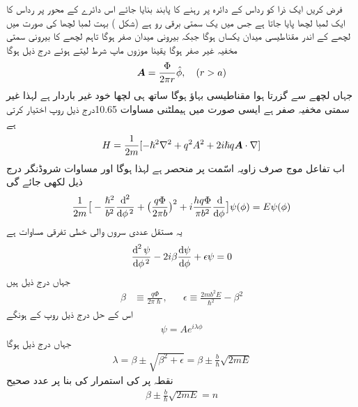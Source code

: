  فرض کریں ایک ذرا کو رداس  کے دائرہ پر رہنے کا پابند بنایا جائے اس دائرے کے محور پر رداس  کا ایک لمبا لچھا پایا جاتا ہے جس میں یک سمتی برقی رو  ہے  (شکل  )   بہت لمبا لچھا کی صورت میں لچھے کے اندر مقناطیسی میدان یکساں ہوگا جبکہ بیرونی میدان صفر ہوگا تاہم لچھے کا بیرونی سمتی مخفیہ غیر صفر ہوگا یقینا موزوں ماپ شرط  لیتے ہوئے درج ذیل ہوگا 
\begin{align}
{\ensuremath{{\boldsymbol{A}}}} = \frac{\Phi}{2\pi r} \hat{\phi}, \quad (r > a)
\end{align}
جہاں  لچھے سے گزرتا ہوا  مقناطیسی بہاؤ ہوگا ساتھ ہی لچھا خود غیر باردار ہے لہذا غیر سمتی مخفیہ  صفر ہے ایسی صورت میں ہیملٹنی مساوات 10.65درج ذیل روپ اختیار کرتی ہے 
\begin{align}
H = \frac{1}{2m} [- \hslash^2 \nabla^2 + q^2 A^2 + 2 i \hslash q {{\boldsymbol{A}}} \cdot \nabla]
\end{align}
اب تفاعل موج صرف زاویہ اسّمت  پر منحصر ہے لہذا  ہوگا اور مساوات شروڈنگر درج ذیل لکھی جائے گی 
\begin{align}
\frac{1}{2m} \big [ - \frac{\hslash^2}{b^2} \frac{\dif^{\,2}}{\dif \phi^{\,2}} + \big ( \frac{q \Phi}{2 \pi b} \big )^2 + i \frac{h q \Phi}{\pi b^2} \frac{\dif}{\dif \phi} \big ] \psi (\phi) = E \psi (\phi)
\end{align}
یہ مستقل عددی سروں والی خطی تفرقی مساوات ہے
\begin{align}
\frac{\dif^{\,2} \psi}{\dif \phi^{\,2}} - 2i \beta \frac{\dif \psi}{\dif \phi} + \epsilon \psi = 0
\end{align}
جہاں درج ذیل ہیں
\begin{align}
\beta &\equiv \frac{q \Phi}{2 \pi \hslash}, && \epsilon \equiv \frac{2 m b ^2 E}{\hslash^2} - \beta^2
\end{align}
اس کے حل درج ذیل روپ کے ہونگے 
\begin{align}
\psi = Ae^{i \lambda \phi}
\end{align}
جہاں درج ذیل ہوگا 
\begin{align}
\lambda = \beta \pm \sqrt{ \beta^2 + \epsilon} = \beta \pm \frac{b}{\hslash} \sqrt{2 m E}
\end{align}
نقطہ  پر  کی استمرار کی بنا پر  عدد صحیح
\begin{align}
\beta \pm \frac{b}{\hslash} \sqrt{2m E} = n
\end{align} 
